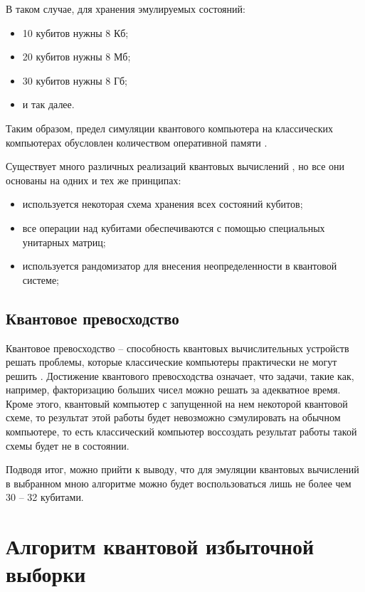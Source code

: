 В таком случае, для хранения эмулируемых состояний:

\begin{itemize}
	\item 10 кубитов нужны 8 Кб;
	\item 20 кубитов нужны 8 Мб;
	\item 30 кубитов нужны 8 Гб;
	\item и так далее.
\end{itemize}

Таким образом, предел симуляции квантового компьютера на классических компьютерах обусловлен количеством оперативной памяти \cite{habr-quantum-computers}.

Существует много различных реализаций квантовых вычислений \cite{habr-quantum-computers}, но все они основаны на одних и тех же принципах:

\begin{itemize}
	\item используется некоторая схема хранения всех состояний кубитов;
	\item все операции над кубитами обеспечиваются с помощью специальных унитарных матриц;
	\item используется рандомизатор для внесения неопределенности в квантовой системе;
\end{itemize}

\subsection{Квантовое превосходство}

Квантовое превосходство -- способность квантовых вычислительных устройств решать проблемы, которые классические компьютеры практически не могут решить \cite{quantum-supremacy}. Достижение квантового превосходства означает, что задачи, такие как, например, факторизацию больших чисел можно решать за адекватное время. Кроме этого, квантовый компьютер с запущенной на нем некоторой квантовой схеме, то результат этой работы будет невозможно сэмулировать на обычном компьютере, то есть классический компьютер воссоздать результат работы такой схемы будет не в состоянии.

Подводя итог, можно прийти к выводу, что для эмуляции квантовых вычислений в выбранном мною алгоритме можно будет воспользоваться лишь не более чем 30 -- 32 кубитами.

\section{Алгоритм квантовой избыточной выборки}

